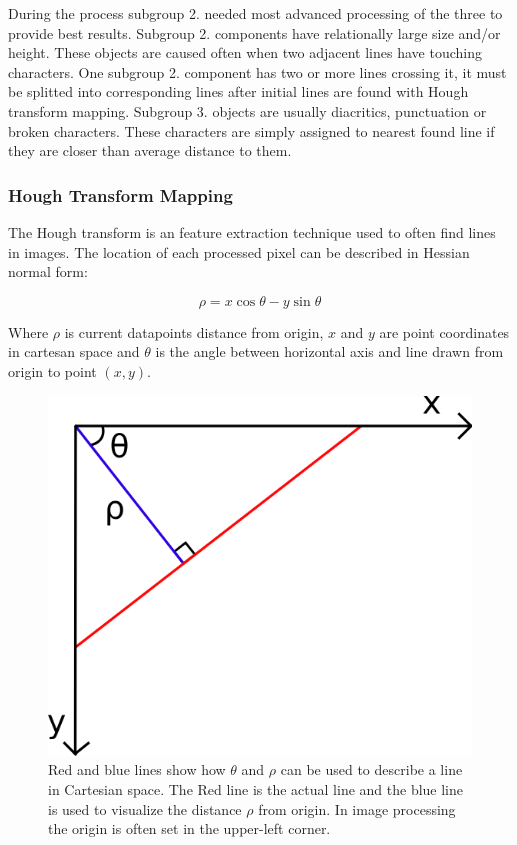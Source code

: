 \documentclass{article}
\begin{document}
            During the process subgroup 2. needed most advanced processing of the three to provide best results. Subgroup 2. components have relationally large size and/or height. These objects are caused often when two adjacent lines have touching characters. One subgroup 2. component has two or more lines crossing it, it must be splitted into corresponding lines after initial lines are found with Hough transform mapping. Subgroup 3. objects are usually diacritics, punctuation or broken characters. These characters are simply assigned to nearest found line if they are closer than average distance to them.

          \subsubsection{Hough Transform Mapping}
          \label{sec:houghtransformmapping}
            The Hough transform is an feature extraction technique used to often find lines in images. The location of each processed pixel can be described in Hessian normal form:

            \begin{equation}
              \rho = x \cos \theta - y \sin \theta
            \end{equation}

            Where $\rho$ is current datapoints distance from origin, $x$ and $y$ are point coordinates in cartesan space and $\theta$ is the angle between horizontal axis and line drawn from origin to point $(x,y)$.

            \begin{figure}[!ht]
              \centering
              \includegraphics[natwidth=555,natheight=555,scale=0.3]{hough_space.png}
              \caption{ Red and blue lines show how $\theta$ and $\rho$ can be used to describe a line in Cartesian space. The Red line is the actual line and the blue line is used to visualize the distance $\rho$ from origin. In image processing the origin is often set in the upper-left corner. \label{fig:houghspace}}
            \end{figure}
\end{document}
